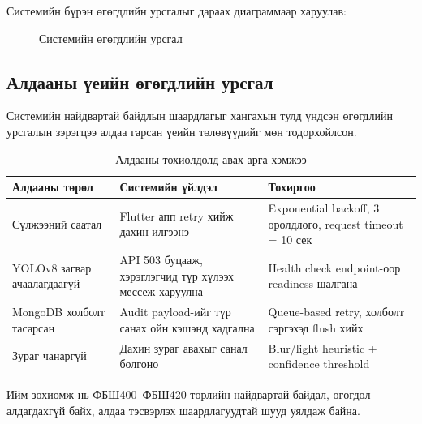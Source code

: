 Системийн бүрэн өгөгдлийн урсгалыг дараах диаграммаар харуулав:

\begin{figure}[H]
\centering
{}
\caption{Системийн өгөгдлийн урсгал}
\label{fig:data_flow}
\end{figure}

\subsection{Алдааны үеийн өгөгдлийн урсгал}

Системийн найдвартай байдлын шаардлагыг хангахын тулд үндсэн өгөгдлийн урсгалын зэрэгцээ алдаа гарсан үеийн төлөвүүдийг мөн тодорхойлсон.

\begin{longtable}{|p{3.2cm}|p{3.2cm}|p{4.8cm}|}
\caption{Алдааны тохиолдолд авах арга хэмжээ}
\label{tab:error_flow} \\
\hline
\textbf{Алдааны төрөл} & \textbf{Системийн үйлдэл} & \textbf{Тохиргоо} \\
\hline
Сүлжээний саатал & Flutter апп retry хийж дахин илгээнэ & Exponential backoff, 3 оролдлого, request timeout = 10 сек \\
\hline
YOLOv8 загвар ачаалагдаагүй & API 503 буцааж, хэрэглэгчид түр хүлээх мессеж харуулна & Health check endpoint-оор readiness шалгана \\
\hline
MongoDB холболт тасарсан & Audit payload-ийг түр санах ойн кэшэнд хадгална & Queue-based retry, холболт сэргэхэд flush хийх \\
\hline
Зураг чанаргүй & Дахин зураг авахыг санал болгоно & Blur/light heuristic + confidence threshold \\
\hline
\end{longtable}

Ийм зохиомж нь ФБШ400--ФБШ420 төрлийн найдвартай байдал, өгөгдөл алдагдахгүй байх, алдаа тэсвэрлэх шаардлагуудтай шууд уялдаж байна.
